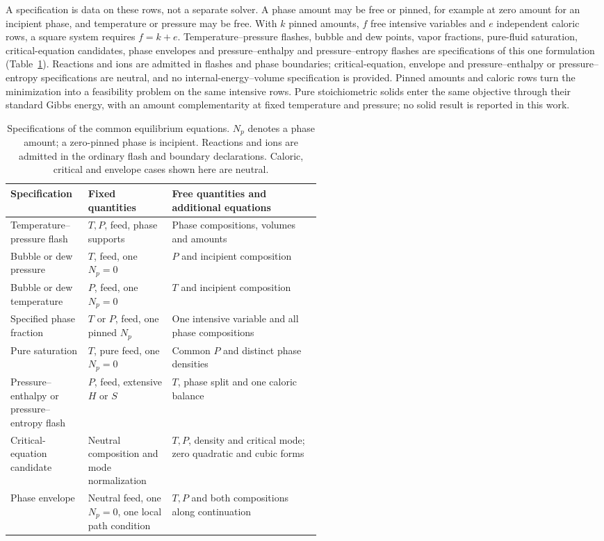 A specification is data on these rows, not a separate solver.
A phase amount may be free or pinned, for example at zero amount for an incipient phase, and temperature or pressure may be free.
With $k$ pinned amounts, $f$ free intensive variables and $e$ independent caloric rows, a square system requires $f=k+e$.
Temperature--pressure flashes, bubble and dew points, vapor fractions, pure-fluid saturation, critical-equation candidates, phase envelopes and pressure--enthalpy and pressure--entropy flashes are specifications of this one formulation (Table~\ref{tab:specifications}).
Reactions and ions are admitted in flashes and phase boundaries; critical-equation, envelope and pressure--enthalpy or pressure--entropy specifications are neutral, and no internal-energy--volume specification is provided.
Pinned amounts and caloric rows turn the minimization into a feasibility problem on the same intensive rows.
Pure stoichiometric solids enter the same objective through their standard Gibbs energy, with an amount complementarity at fixed temperature and pressure; no solid result is reported in this work.

\begin{table}[pos=htbp]
\centering\small
\caption{Specifications of the common equilibrium equations. $N_p$ denotes a phase amount; a zero-pinned phase is incipient. Reactions and ions are admitted in the ordinary flash and boundary declarations. Caloric, critical and envelope cases shown here are neutral.}
\label{tab:specifications}
\begin{tabularx}{\linewidth}{@{}p{0.25\linewidth}p{0.27\linewidth}X@{}}
\toprule
Specification & Fixed quantities & Free quantities and additional equations \\
\midrule
Temperature--pressure flash & $T,P$, feed, phase supports & Phase compositions, volumes and amounts \\
Bubble or dew pressure & $T$, feed, one $N_p=0$ & $P$ and incipient composition \\
Bubble or dew temperature & $P$, feed, one $N_p=0$ & $T$ and incipient composition \\
Specified phase fraction & $T$ or $P$, feed, one pinned $N_p$ & One intensive variable and all phase compositions \\
Pure saturation & $T$, pure feed, one $N_p=0$ & Common $P$ and distinct phase densities \\
Pressure--enthalpy or pressure--entropy flash & $P$, feed, extensive $H$ or $S$ & $T$, phase split and one caloric balance \\
Critical-equation candidate & Neutral composition and mode normalization & $T,P$, density and critical mode; zero quadratic and cubic forms \\
Phase envelope & Neutral feed, one $N_p=0$, one local path condition & $T,P$ and both compositions along continuation \\
\bottomrule
\end{tabularx}
\end{table}

